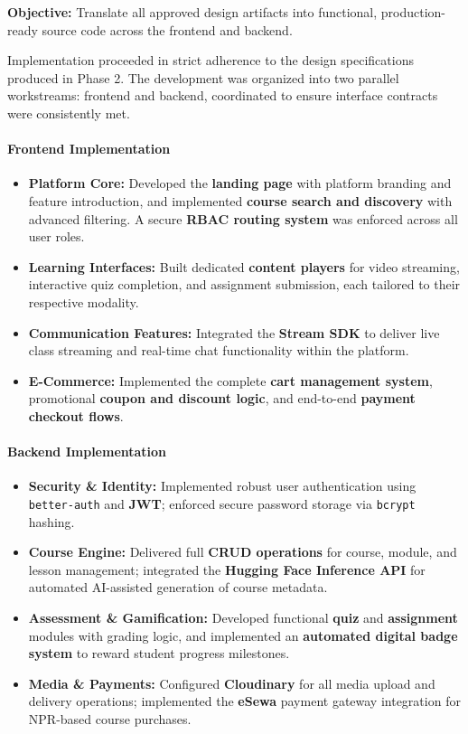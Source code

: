 \textbf{Objective:} Translate all approved design artifacts into functional, production-ready source code across the frontend and backend.

Implementation proceeded in strict adherence to the design specifications produced in Phase 2. The development was organized into two parallel workstreams: frontend and backend, coordinated to ensure interface contracts were consistently met.

\paragraph{Frontend Implementation}
\begin{itemize}
    \item \textbf{Platform Core:} Developed the \textbf{landing page} with platform branding and feature introduction, and implemented \textbf{course search and discovery} with advanced filtering. A secure \textbf{RBAC routing system} was enforced across all user roles.
    \item \textbf{Learning Interfaces:} Built dedicated \textbf{content players} for video streaming, interactive quiz completion, and assignment submission, each tailored to their respective modality.
    \item \textbf{Communication Features:} Integrated the \textbf{Stream SDK} to deliver live class streaming and real-time chat functionality within the platform.
    \item \textbf{E-Commerce:} Implemented the complete \textbf{cart management system}, promotional \textbf{coupon and discount logic}, and end-to-end \textbf{payment checkout flows}.
\end{itemize}

\paragraph{Backend Implementation}
\begin{itemize}
    \item \textbf{Security \& Identity:} Implemented robust user authentication using \texttt{better-auth} and \textbf{JWT}; enforced secure password storage via \texttt{bcrypt} hashing.
    \item \textbf{Course Engine:} Delivered full \textbf{CRUD operations} for course, module, and lesson management; integrated the \textbf{Hugging Face Inference API} for automated AI-assisted generation of course metadata.
    \item \textbf{Assessment \& Gamification:} Developed functional \textbf{quiz} and \textbf{assignment} modules with grading logic, and implemented an \textbf{automated digital badge system} to reward student progress milestones.
    \item \textbf{Media \& Payments:} Configured \textbf{Cloudinary} for all media upload and delivery operations; implemented the \textbf{eSewa} payment gateway integration for NPR-based course purchases.
\end{itemize}

